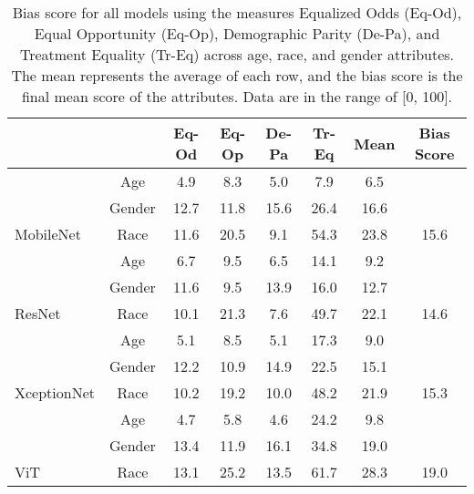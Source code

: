 \begin{table}[t] 
\caption{Bias score for all models using the measures Equalized Odds (Eq-Od), Equal Opportunity (Eq-Op), Demographic Parity (De-Pa), and Treatment Equality (Tr-Eq) across age, race, and gender attributes. The mean represents the average of each row, and the bias score is the final mean score of the attributes. Data are in the range of [0, 100].}
\label{tbl:bias_score_for_all_models}
\centering
\small
\setlength{\tabcolsep}{5pt} %
\resizebox{1.0\linewidth}{!}
{
\begin{tabular}{lc|>{\color{mediumgray}}c>{\color{mediumgray}}c>{\color{mediumgray}}c>{\color{mediumgray}}c|c|c}
                                                   &        & \color{black}Eq-Od & \color{black}Eq-Op & \color{black}De-Pa 
                                                   & \color{black}Tr-Eq & Mean & Bias Score\\ \hline
\multicolumn{1}{l|}{}                              & Age    & 4.9 & 8.3 & 5.0 & 7.9 & 6.5 & \\
\multicolumn{1}{l|}{}                              & Gender & 12.7 & 11.8 & 15.6 & 26.4 & 16.6 & \\
\multicolumn{1}{l|}{\multirow{-3}{*}{MobileNet}}   & Race   & 11.6 & 20.5 & 9.1 & 54.3 & 23.8 & \multirow{-3}{*}{15.6} \\ \hline
\multicolumn{1}{l|}{}                              & Age    & 6.7 & 9.5 & 6.5 & 14.1 & 9.2  & \\
\multicolumn{1}{l|}{}                              & Gender & 11.6 & 9.5 & 13.9 & 16.0 & 12.7 & \\
\multicolumn{1}{l|}{\multirow{-3}{*}{ResNet}}      & Race   & 10.1 & 21.3 & 7.6 & 49.7 & 22.1 & \multirow{-3}{*}{14.6} \\ \hline
\multicolumn{1}{l|}{}                              & Age    & 5.1 & 8.5 & 5.1 & 17.3 & 9.0 & \\
\multicolumn{1}{l|}{}                              & Gender & 12.2 & 10.9 & 14.9 & 22.5 & 15.1 & \\
\multicolumn{1}{l|}{\multirow{-3}{*}{XceptionNet}} & Race   & 10.2 & 19.2 & 10.0 & 48.2 & 21.9 & \multirow{-3}{*}{15.3} \\ \hline
\multicolumn{1}{l|}{}                              & Age    & 4.7 & 5.8 & 4.6 & 24.2 & 9.8 & \\
\multicolumn{1}{l|}{}                              & Gender & 13.4 & 11.9 & 16.1 & 34.8 & 19.0 & \\
\multicolumn{1}{l|}{\multirow{-3}{*}{ViT}}         & Race   & 13.1 & 25.2 & 13.5 & 61.7 & 28.3 & \multirow{-3}{*}{19.0}  \\ \hline

\end{tabular}}
\end{table}
